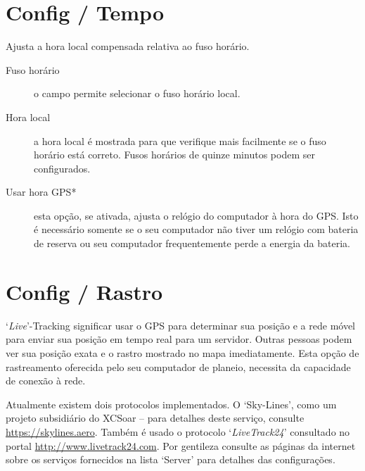 \section{Config / Tempo}

Ajusta a hora local compensada relativa ao fuso horário.

\begin{description}
\item[Fuso horário]  o campo permite selecionar o fuso horário local.
\item[Hora local]  a hora local é mostrada para que verifique mais facilmente se o fuso horário está correto.  Fusos horários de quinze minutos podem ser configurados.
\item[Usar hora GPS*] esta opção, se ativada, ajusta o relógio do computador à hora do GPS.  Isto é necessário somente se o seu computador não tiver um relógio com bateria de reserva ou seu computador frequentemente perde a energia da bateria.
\end{description}


\section{Config / Rastro}

`{\it Live}'-Tracking significar usar o GPS para determinar sua posição e a rede móvel para enviar sua posição em tempo real para um servidor.  Outras pessoas podem ver sua posição exata e o rastro mostrado no mapa imediatamente.  Esta opção de rastreamento oferecida pelo seu computador de planeio, necessita da capacidade de conexão à rede.  

Atualmente existem dois protocolos implementados. O ‘Sky-Lines’, como um projeto subsidiário do XCSoar – para detalhes deste serviço, consulte
\url{https://skylines.aero}. 
Também é usado o protocolo  `{\em LiveTrack24}' consultado no portal  \url{http://www.livetrack24.com}.  
Por gentileza consulte as páginas da internet sobre os serviços fornecidos na lista ‘Server’ para detalhes das configurações.

